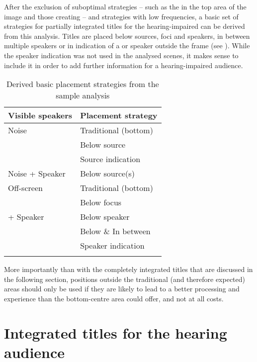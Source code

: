 After the exclusion of suboptimal strategies – such as the  in the top area of the image and those creating  – and strategies with low frequencies, a basic set of  strategies for partially integrated titles for the hearing-impaired can be derived from this analysis. Titles are placed below sources, foci and speakers, in between multiple speakers or in indication of a  or speaker outside the frame (see ). While the speaker indication was not used in the analysed scenes, it makes sense to include it in order to add further information for a hearing-impaired audience.

\begin{table}
\begin{tabularx}{\textwidth}{XX}
\lsptoprule
 Visible speakers &  Placement strategy\\
 \midrule
 Noise & Traditional (bottom)\\
& Below source\\
& Source indication\\
\tablevspace
 Noise + Speaker & Below source(s)\\
\tablevspace
 Off-screen & Traditional (bottom)\\
& Below focus\\
\tablevspace
 1+ Speaker & Below speaker\\
& Below \& In between\\
& Speaker indication\\
\lspbottomrule
\end{tabularx}
\caption{Derived basic placement strategies from the sample analysis} 
\label{tab:TAB8}
\end{table}

More importantly than with the completely integrated titles that are discussed in the following section, positions outside the traditional (and therefore expected) areas should only be used if they are likely to lead to a better processing and experience than the bottom-centre area could offer, and not at all costs.

\newpage 
\section{Integrated titles for the hearing audience}\label{sec:4.2}

